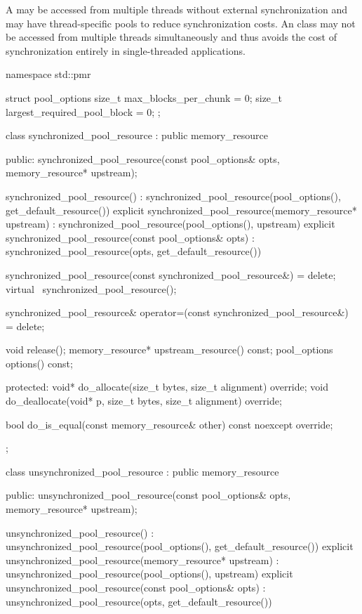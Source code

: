\pnum
A  may be accessed from multiple threads
without external synchronization
and may have thread-specific pools to reduce synchronization costs.
An  class may not be accessed
from multiple threads simultaneously
and thus avoids the cost of synchronization entirely
in single-threaded applications.

%
%
%
\begin{codeblock}
namespace std::pmr {
  struct pool_options {
    size_t max_blocks_per_chunk = 0;
    size_t largest_required_pool_block = 0;
  };

  class synchronized_pool_resource : public memory_resource {
  public:
    synchronized_pool_resource(const pool_options& opts, memory_resource* upstream);

    synchronized_pool_resource()
        : synchronized_pool_resource(pool_options(), get_default_resource()) {}
    explicit synchronized_pool_resource(memory_resource* upstream)
        : synchronized_pool_resource(pool_options(), upstream) {}
    explicit synchronized_pool_resource(const pool_options& opts)
        : synchronized_pool_resource(opts, get_default_resource()) {}

    synchronized_pool_resource(const synchronized_pool_resource&) = delete;
    virtual ~synchronized_pool_resource();

    synchronized_pool_resource& operator=(const synchronized_pool_resource&) = delete;

    void release();
    memory_resource* upstream_resource() const;
    pool_options options() const;

  protected:
    void* do_allocate(size_t bytes, size_t alignment) override;
    void do_deallocate(void* p, size_t bytes, size_t alignment) override;

    bool do_is_equal(const memory_resource& other) const noexcept override;
  };

  class unsynchronized_pool_resource : public memory_resource {
  public:
    unsynchronized_pool_resource(const pool_options& opts, memory_resource* upstream);

    unsynchronized_pool_resource()
        : unsynchronized_pool_resource(pool_options(), get_default_resource()) {}
    explicit unsynchronized_pool_resource(memory_resource* upstream)
        : unsynchronized_pool_resource(pool_options(), upstream) {}
    explicit unsynchronized_pool_resource(const pool_options& opts)
        : unsynchronized_pool_resource(opts, get_default_resource()) {}

}}
\end{codeblock}
